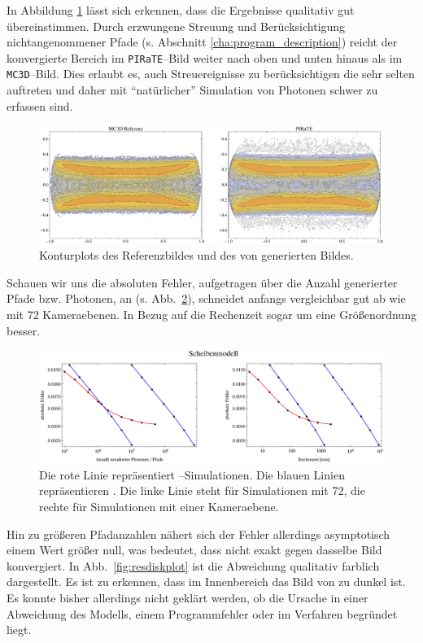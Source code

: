 	In Abbildung \ref{fig:disk_contours}	lässt sich erkennen, dass die Ergebnisse qualitativ gut übereinstimmen. Durch erzwungene Streuung und Berücksichtigung nichtangenommener Pfade (s. Abschnitt \ref{cha:program_description}) reicht der konvergierte Bereich im \texttt{PIRaTE}--Bild weiter nach oben und unten hinaus als im \texttt{MC3D}--Bild. Dies erlaubt es, auch Streuereignisse zu berücksichtigen die sehr selten auftreten und daher mit ``natürlicher'' Simulation von Photonen schwer zu erfassen sind.
	
		\begin{figure}
			\centering
			\includegraphics[width=1.0\textwidth]{diskcontourplots.eps}
			\caption{Konturplots des Referenzbildes und des von \pirate generierten Bildes.}
			\label{fig:disk_contours}
		\end{figure}
	
	Schauen wir uns die absoluten Fehler, aufgetragen über die Anzahl generierter Pfade bzw. Photonen, an (s. Abb.~\ref{fig:disk_error}), schneidet \pirate anfangs vergleichbar gut ab wie \mctd mit 72 Kameraebenen. In Bezug auf die Rechenzeit sogar um eine Größenordnung besser.
	
		\begin{figure}
			\centering
			\includegraphics[width=1.0\textwidth]{diskerrorplot.eps}
			\caption{Die rote Linie repräsentiert \pirate--Simulationen. Die blauen Linien repräsentieren \mctd. Die linke Linie steht für Simulationen mit 72, die rechte für Simulationen mit einer Kameraebene.}
			\label{fig:disk_error}
		\end{figure}
	
	Hin zu größeren Pfadanzahlen nähert sich der Fehler allerdings asymptotisch einem Wert größer null, was bedeutet, dass \pirate nicht exakt gegen dasselbe Bild konvergiert. In Abb.~\ref{fig:resdiskplot} ist die Abweichung qualitativ farblich dargestellt. Es ist zu erkennen, dass im Innenbereich das Bild von \pirate zu dunkel ist. Es konnte bisher allerdings nicht geklärt werden, ob die Ursache in einer Abweichung des Modells, einem Programmfehler oder im Verfahren begründet liegt.
	
